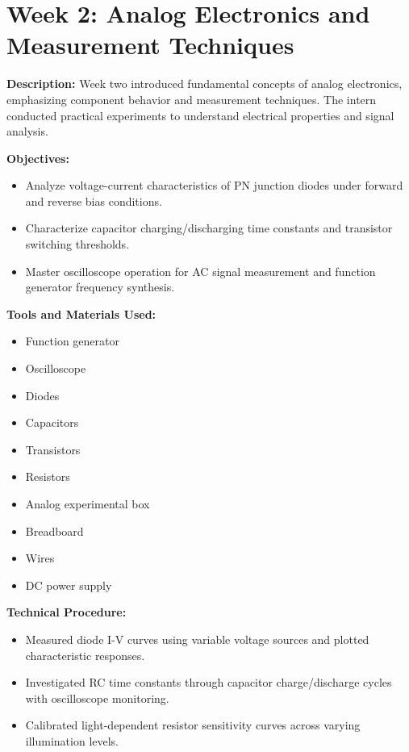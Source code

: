 \documentclass[12pt,a4paper]{report}
\begin{document}
\section{Week 2: Analog Electronics and Measurement Techniques}

\noindent\textbf{Description:} Week two introduced fundamental concepts of analog electronics, emphasizing component behavior and measurement techniques. The intern conducted practical experiments to understand electrical properties and signal analysis.

\noindent\textbf{Objectives:}
\begin{itemize}
    \item Analyze voltage-current characteristics of PN junction diodes under forward and reverse bias conditions.
    \item Characterize capacitor charging/discharging time constants and transistor switching thresholds.
    \item Master oscilloscope operation for AC signal measurement and function generator frequency synthesis.
\end{itemize}

\noindent\textbf{Tools and Materials Used:}
\begin{multicols}{2}
\begin{itemize}
    \item Function generator
    \item Oscilloscope
    \item Diodes
    \item Capacitors
    \item Transistors
    \item Resistors
    \item Analog experimental box
    \item Breadboard
    \item Wires
    \item DC power supply
\end{itemize}
\end{multicols}

\noindent\textbf{Technical Procedure:}
\begin{itemize}
    \item Measured diode I-V curves using variable voltage sources and plotted characteristic responses.
    \item Investigated RC time constants through capacitor charge/discharge cycles with oscilloscope monitoring.
    \item Calibrated light-dependent resistor sensitivity curves across varying illumination levels.
\end{itemize}
\end{document}
